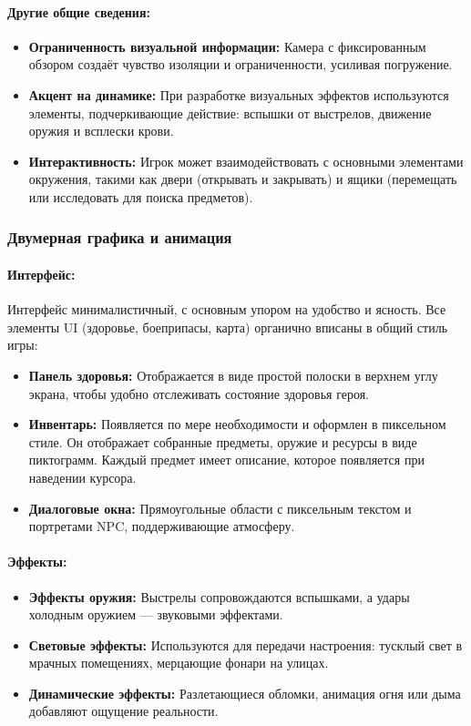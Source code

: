 \documentclass[12pt]{article}
\begin{document}
        \paragraph{Другие общие сведения:} 
        \begin{itemize}
            \item \textbf{Ограниченность визуальной информации:} Камера с фиксированным обзором создаёт чувство изоляции и ограниченности, усиливая погружение.
            \item \textbf{Акцент на динамике:} При разработке визуальных эффектов используются элементы, подчеркивающие действие: вспышки от выстрелов, движение оружия и всплески крови.
            \item \textbf{Интерактивность:} Игрок может взаимодействовать с основными элементами окружения, такими как двери (открывать и закрывать) и ящики (перемещать или исследовать для поиска предметов). 
        \end{itemize}
        
    \subsubsection{Двумерная графика и анимация}
        \paragraph{Интерфейс:} 
        Интерфейс минималистичный, с основным упором на удобство и ясность. Все элементы UI (здоровье, боеприпасы, карта) органично вписаны в общий стиль игры:
        \begin{itemize}
            \item \textbf{Панель здоровья:} Отображается в виде простой полоски в верхнем углу экрана, чтобы удобно отслеживать состояние здоровья героя.
            \item \textbf{Инвентарь:} Появляется по мере необходимости и оформлен в пиксельном стиле. Он отображает собранные предметы, оружие и ресурсы в виде пиктограмм. Каждый предмет имеет описание, которое появляется при наведении курсора.
            \item \textbf{Диалоговые окна:} Прямоугольные области с пиксельным текстом и портретами NPC, поддерживающие атмосферу.
        \end{itemize}
        
        \paragraph{Эффекты:} 
        \begin{itemize}
            \item \textbf{Эффекты оружия:} Выстрелы сопровождаются вспышками, а удары холодным оружием — звуковыми эффектами.
            \item \textbf{Световые эффекты:} Используются для передачи настроения: тусклый свет в мрачных помещениях, мерцающие фонари на улицах.
            \item \textbf{Динамические эффекты:} Разлетающиеся обломки, анимация огня или дыма добавляют ощущение реальности.
        \end{itemize}
        
\end{document}
